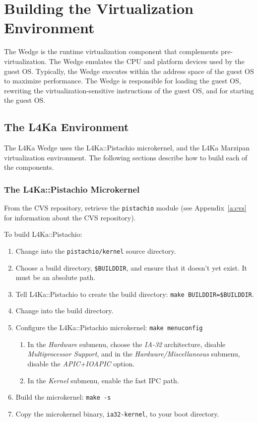 \documentclass[twoside,a4paper]{report}
\newcommand{\code}[1]{{\tt #1}}
\newcommand{\cmd}[1]{\code{#1}}
\newcommand{\Pistachio}{L4Ka::Pistachio}
\begin{document}
%
%
\chapter{Building the Virtualization Environment}

The Wedge is the runtime virtualization component that complements
pre-virtualization.  The Wedge emulates the CPU and platform devices
used by the guest OS.  Typically, the Wedge executes within the
address space of the guest OS to maximize performance.  The Wedge is
responsible for loading the guest OS, rewriting the
virtualization-sensitive instructions of the guest OS, and for
starting the guest OS.

\section{The L4Ka Environment}

The L4Ka Wedge uses the \Pistachio{} microkernel, and the L4Ka
Marzipan virtualization environment.  The following sections describe
how to build each of the components.

\subsection{The \Pistachio{} Microkernel}

From the CVS repository, retrieve the \code{pistachio} module
(see Appendix~\ref{a:cvs} for information about the CVS repository).

To build \Pistachio{}:
\begin{enumerate}
\item Change into the \code{pistachio/kernel} source directory.
\item Choose a build directory, \code{\$BUILDDIR}, and ensure that it
doesn't yet exist.  It must be an absolute path.
\item Tell \Pistachio{} to create the build directory: 
\cmd{make BUILDDIR=\$BUILDDIR}.
\item Change into the build directory.
\item Configure the \Pistachio{} microkernel: \cmd{make menuconfig}
  \begin{enumerate}
  \item In the \emph{Hardware} submenu, choose the \emph{IA-32}
  architecture, disable \emph{Multiprocessor Support}, and in the 
  \emph{Hardware/Miscellaneous} submenu, disable the
  \emph{APIC+IOAPIC} option.
  \item In the \emph{Kernel} submenu, enable the fast IPC path.
  \end{enumerate}
\item Build the microkernel: \cmd{make -s}
\item Copy the microkernel binary, \code{ia32-kernel}, to your boot
directory.
\end{enumerate}
\end{document}
